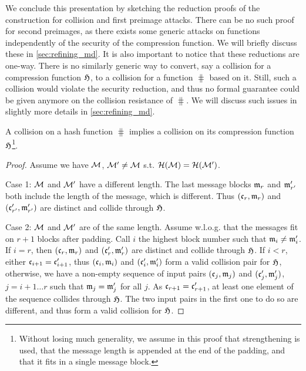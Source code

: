 We conclude this presentation by sketching the reduction proofs of the construction for collision and first preimage attacks. There can be no such proof
for second preimages, as there exists some generic attacks on \merkdam functions independently of the security of the compression function. We will
briefly discuss these in \autoref{sec:refining_md}.
It is also important to notice that these reductions are one-way. There is no similarly generic way to convert, say a collision for a compression function $\operatorname{\mathfrak{H}}$,
to a collision for a \merkdam function $\hash$ based on it. Still, such a collision would violate the security reduction, and thus no formal guarantee could be given
anymore on the collision resistance of $\hash$. We will discuss such issues in slightly more details in \autoref{sec:refining_md}.

\begin{prop}
A collision on a \merkdam hash function $\hash$ implies a collision on its compression function $\operatorname{\mathfrak{H}}$\footnote{Without losing much generality, we assume in this proof
that \merkdam strengthening is used, that the message length is appended at the end of the padding, and that it fits in a single message block.}.
\end{prop}
\begin{proof}
Assume we have $\mathcal{M}$, $\mathcal{M}' \neq \mathcal{M}$ s.t. $\operatorname{\mathcal{H}}(\mathcal{M}) = \operatorname{\mathcal{H}}(\mathcal{M}')$.

Case 1: $\mathcal{M}$ and $\mathcal{M}'$ have a different length.
The last message blocks $\mathfrak{m}_r$ and $\mathfrak{m}'_{r'}$ both include the length
of the message, which is different. Thus $(\mathfrak{c}_r,\mathfrak{m}_r)$ and $(\mathfrak{c}'_{r'}, \mathfrak{m}'_{r'})$ are distinct and collide through $\operatorname{\mathfrak{H}}$.

Case 2: $\mathcal{M}$ and $\mathcal{M}'$ are of the same length. Assume w.l.o.g. that the messages fit on $r + 1$ blocks after padding.
Call $i$ the highest block number such that $\mathfrak{m}_{i} \neq \mathfrak{m}'_{i}$. If $i = r$, then $(\mathfrak{c}_r,\mathfrak{m}_r)$ and $(\mathfrak{c}'_{r}, \mathfrak{m}'_{r})$
are distinct and collide through $\operatorname{\mathfrak{H}}$. If $i < r$, either $\mathfrak{c}_{i+1} = \mathfrak{c}'_{i+1}$, thus $(\mathfrak{c}_i,\mathfrak{m}_i)$ and $(\mathfrak{c}'_{i}, \mathfrak{m}'_{i})$
form a valid collision pair for $\operatorname{\mathfrak{H}}$, otherwise, we have a non-empty sequence of input pairs $(\mathfrak{c}_j, \mathfrak{m}_j)$ and $(\mathfrak{c}'_j, \mathfrak{m}'_j)$,
$j = i+1\ldots r$ such that $\mathfrak{m}_j = \mathfrak{m}'_j$ for all $j$. As $\mathfrak{c}_{r+1} = \mathfrak{c}'_{r+1}$, at least one element of the sequence
collides through $\operatorname{\mathfrak{H}}$. The two input pairs in the first one to do so are different, and thus form a valid collision for $\operatorname{\mathfrak{H}}$.
\end{proof}

